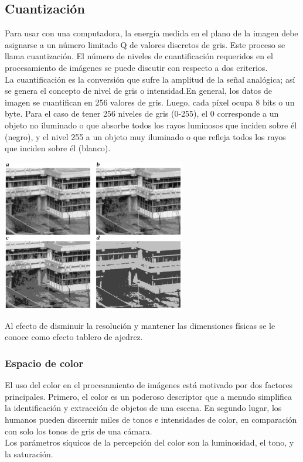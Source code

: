 \subsection{Cuantización}
Para usar con una computadora, la energía medida en el plano de la imagen debe 
asignarse a un número limitado Q de valores discretos de gris. Este proceso se llama 
cuantización. El número de niveles de cuantificación requeridos en el procesamiento de 
imágenes se puede discutir con respecto a dos criterios.\cite{Richard2011}\\
La cuantificación es la conversión
que sufre la amplitud de la señal analógica; así se genera el concepto de nivel de gris o
intensidad.En general, los datos de imagen se cuantifican en 256 valores de gris. 
Luego, cada píxel ocupa 8 bits o un byte. Para el caso de tener 256 niveles de gris (0-255), el 0 corresponde a un
objeto no iluminado o que absorbe todos los rayos luminosos que inciden sobre él
(negro), y el nivel 255 a un objeto muy iluminado o que refleja todos los rayos que
inciden sobre él (blanco).
\begin{center}
    \includegraphics[width=0.6\textwidth]{Capitulo2/Fig9.eps}
    \label{Fig9}
\end{center}
Al efecto de disminuir la resolución y mantener las
dimensiones físicas se le conoce como efecto tablero de ajedrez.

\subsubsection{Espacio de color}
El uso del color en el procesamiento de imágenes está motivado por dos factores principales. 
Primero, el color es un poderoso descriptor que a menudo simplifica la identificación y 
extracción de objetos de una escena. En segundo lugar, los humanos pueden discernir miles 
de tonos e intensidades de color, en comparación con solo los tonos de gris de una cámara.
\cite{Rafael2002}\\
Los parámetros síquicos de la percepción del color son la luminosidad, el tono, y
la saturación.